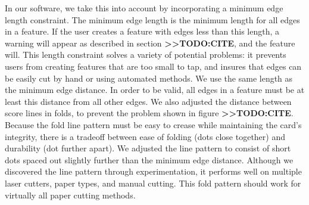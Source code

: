 In our software, we take this into account by incorporating a minimum
edge length constraint. The minimum edge length is the minimum length
for all edges in a feature. If the user creates a feature with edges
less than this length, a warning will appear as described in section
\textbf{\textgreater{}\textgreater{}TODO:CITE}, and the feature will.
This length constraint solves a variety of potential problems: it
prevents users from creating features that are too small to tap, and
insures that edges can be easily cut by hand or using automated methods.
We use the same length as the minimum edge distance. In order to be
valid, all edges in a feature must be at least this distance from all
other edges. We also adjusted the distance between score lines in folds,
to prevent the problem shown in figure
\textbf{\textgreater{}\textgreater{}TODO:CITE}. Because the fold line
pattern must be easy to crease while maintaining the card's integrity,
there is a tradeoff between ease of folding (dots close together) and
durability (dot further apart). We adjusted the line pattern to consist
of short dots spaced out slightly further than the minimum edge
distance. Although we discovered the line pattern through
experimentation, it performs well on multiple laser cutters, paper
types, and manual cutting. This fold pattern should work for virtually
all paper cutting methods.
